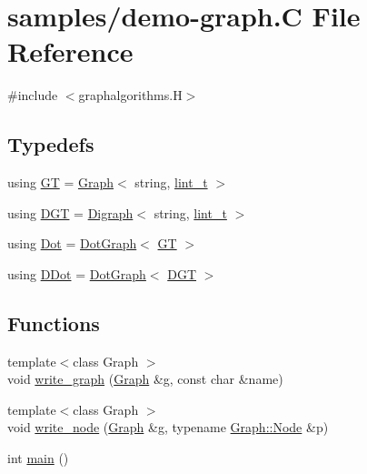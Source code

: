 \hypertarget{demo-graph_8_c}{}\section{samples/demo-\/graph.C File Reference}
\label{demo-graph_8_c}
{\ttfamily \#include $<$graphalgorithms.\+H$>$}\newline
\subsection*{Typedefs}
\begin{DoxyCompactItemize}
\item 
using \hyperlink{demo-graph_8_c_aa29146ba261a2a26fce51cbd8557db3b}{GT} = \hyperlink{class_designar_1_1_graph}{Graph}$<$ string, \hyperlink{namespace_designar_a9d113d66a39e82b73727c72cd3a52f73}{lint\+\_\+t} $>$
\item 
using \hyperlink{demo-graph_8_c_a6b9eddfa4274f215240c1c90be9df2dc}{D\+GT} = \hyperlink{class_designar_1_1_digraph}{Digraph}$<$ string, \hyperlink{namespace_designar_a9d113d66a39e82b73727c72cd3a52f73}{lint\+\_\+t} $>$
\item 
using \hyperlink{demo-graph_8_c_a70657b0b48a4d69ef850be3c5517ecc2}{Dot} = \hyperlink{class_designar_1_1_dot_graph}{Dot\+Graph}$<$ \hyperlink{demo-buildgraph_8_c_a3001c40d2c31ca87ed96cd7d1334a55e}{GT} $>$
\item 
using \hyperlink{demo-graph_8_c_a0ffdd103a7285712ccbd9548ff5544e7}{D\+Dot} = \hyperlink{class_designar_1_1_dot_graph}{Dot\+Graph}$<$ \hyperlink{demo-buildgraph_8_c_ae73e956c2a8cf0a58255aa6b659985e0}{D\+GT} $>$
\end{DoxyCompactItemize}
\subsection*{Functions}
\begin{DoxyCompactItemize}
\item 
{\footnotesize template$<$class Graph $>$ }\\void \hyperlink{demo-graph_8_c_a75dee8f1e6289c0fbd2060e643605bfe}{write\+\_\+graph} (\hyperlink{class_designar_1_1_graph}{Graph} \&g, const char \&name)
\item 
{\footnotesize template$<$class Graph $>$ }\\void \hyperlink{demo-graph_8_c_abe260b66e94b606f11fd75beedd0f6dc}{write\+\_\+node} (\hyperlink{class_designar_1_1_graph}{Graph} \&g, typename \hyperlink{class_designar_1_1_graph_a5dfc7dba9d092ac489c72e40390c37d0}{Graph\+::\+Node} \&p)
\item 
int \hyperlink{demo-graph_8_c_ae66f6b31b5ad750f1fe042a706a4e3d4}{main} ()
\end{DoxyCompactItemize}


